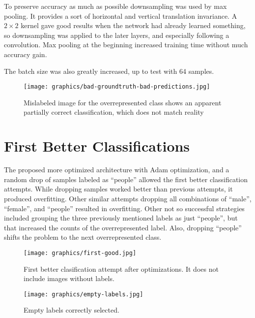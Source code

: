 \documentclass{article}
\begin{document}
To preserve accuracy as much as possible downsampling was used by max pooling. 
It provides a sort of horizontal and vertical translation invariance.
A \(2 \times 2\) kernel gave good results when the network had already learned something, so downsampling was applied to the later layers, and especially following a convolution.
Max pooling at the beginning increased training time without much accuracy gain.

The batch size was also greatly increased, up to test with 64 samples.

\begin{figure}[ht]
  \centering
  \texttt{[image: graphics/bad-groundtruth-bad-predictions.jpg]}
  \caption{Mislabeled image for the overrepresented class shows an apparent partially correct classification, which does not match reality}
\end{figure}

\section{First Better Classifications}
The proposed more optimized architecture with Adam optimization, and a random drop of samples labeled as ``people'' allowed the first better classification attempts.
While dropping samples worked better than previous attempts, it produced overfitting.
Other similar attempts dropping all combinations of ``male'', ``female'', and ``people'' resulted in overfitting.
Other not so successful strategies included grouping the three previously mentioned labels as just ``people'', but that increased the counts of the overrepresented label.
Also, dropping ``people'' shifts the problem to the next overrepresented class.


\begin{figure}[ht]
  \centering
  \texttt{[image: graphics/first-good.jpg]}
  \caption{First better clasification attempt after optimizations.
      It does not include images without labels.
	}
\end{figure}

\begin{figure}[ht]
  \centering
  \texttt{[image: graphics/empty-labels.jpg]}
  \caption{Empty labels correctly selected.}
\end{figure}
\end{document}
